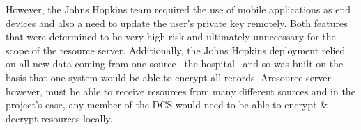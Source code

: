 However, the Johns Hopkins team required the use of mobile applications as end devices and also a need to update the user's private key remotely. Both features that were determined to be very high risk and ultimately unnecessary for the scope of the resource server. Additionally, the Johns Hopkins deployment relied on all new data coming from one source \textemdash\ the hospital \textemdash\ and so was built on the basis that one system would be able to encrypt all records. Aresource server however, must be able to receive resources from many different sources and in the project's case, any member of the DCS would need to be able to encrypt \& decrypt resources locally.
